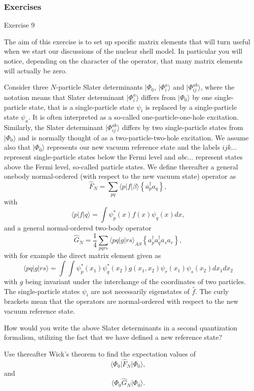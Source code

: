 \documentclass{beamer}
\begin{document}
\begin{frame}
\frametitle{Exercises}

\begin{block}{Exercise 9 }

The aim of this exercise is to set up specific matrix elements that will turn useful when we start our discussions of the nuclear shell model. In particular you will notice, depending on the character of the operator, that many matrix elements will actually be zero.

Consider three $N$-particle  Slater determinants  $|\Phi_0$, $|\Phi_i^a\rangle$ and $|\Phi_{ij}^{ab}\rangle$, where the notation means that 
Slater determinant $|\Phi_i^a\rangle$ differs from $|\Phi_0\rangle$ by one single-particle state, that is a single-particle
state $\psi_i$ is replaced by a single-particle state $\psi_a$. 
It is often interpreted as a so-called one-particle-one-hole excitation.
Similarly, the Slater determinant $|\Phi_{ij}^{ab}\rangle$
differs by two single-particle states from $|\Phi_0\rangle$ and is normally thought of as a two-particle-two-hole excitation.
We assume also that $|\Phi_0\rangle$ represents our new vacuum reference state
and the labels $ijk\dots$ represent single-particle states below the Fermi level and $abc\dots$ represent states above the Fermi level, so-called particle states.
We define thereafter a general onebody normal-ordered (with respect to the new vacuum state) operator 
as
\[
\hat{F}_N=\sum_{pq}\langle p |f |\beta\rangle \left\{a_{p}^{\dagger}a_{q}\right\}  ,
\]
with
\[
\langle p |f| q\rangle=\int \psi_{p}^{*}(x)f(x)\psi_{q}(x)dx ,
\]
and a general normal-ordered two-body operator
\[
\hat{G}_N = \frac{1}{4}\sum_{pqrs}
\langle pq |g| rs\rangle_{AS} \left\{a_{p}^{\dagger}a_{q}^{\dagger}a_{s}a_{r}\right\} ,
\]
with for example the direct matrix element given as
\[
\langle pq |g| rs\rangle=
\int\int \psi_{p}^{*}(x_{1})\psi_{q}^{*}(x_{2})g(x_{1}, x_{2})\psi_{r}(x_{1})\psi_{s}(x_{2})dx_{1}dx_{2}
\]
with $g$ being invariant under the interchange of the coordinates of two particles.
The single-particle states $\psi_i$ are not necessarily eigenstates of $\hat{f}$.  The curly brackets mean that the operators are normal-ordered with respect to the new vacuum reference state. 

How would you write the above Slater determinants in a second quantization formalism, utilizing the fact that we have defined a new reference state? 

Use thereafter Wick's theorem to find the expectation values of 
\[
\langle \Phi_0 \vert\hat{F}_N\vert\Phi_0\rangle,
\]
and
\[
\langle \Phi_0\hat{G}_N|\Phi_0\rangle.
\]


\end{block}
\end{frame}
\end{document}
